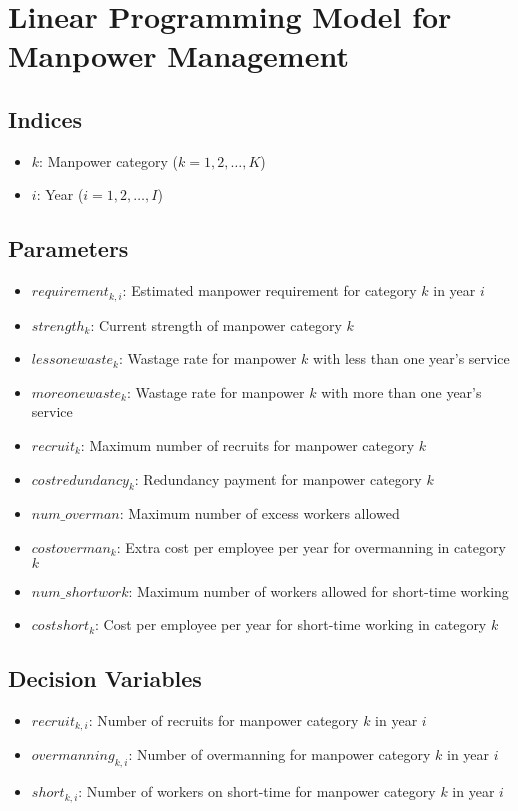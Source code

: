 \documentclass{article}
\begin{document}
\section*{Linear Programming Model for Manpower Management}

\subsection*{Indices}
\begin{itemize}
    \item $k$: Manpower category ($k = 1, 2, \ldots, K$)
    \item $i$: Year ($i = 1, 2, \ldots, I$)
\end{itemize}

\subsection*{Parameters}
\begin{itemize}
    \item $requirement_{k,i}$: Estimated manpower requirement for category $k$ in year $i$
    \item $strength_k$: Current strength of manpower category $k$
    \item $lessonewaste_k$: Wastage rate for manpower $k$ with less than one year's service
    \item $moreonewaste_k$: Wastage rate for manpower $k$ with more than one year's service
    \item $recruit_k$: Maximum number of recruits for manpower category $k$
    \item $costredundancy_k$: Redundancy payment for manpower category $k$
    \item $num\_overman$: Maximum number of excess workers allowed
    \item $costoverman_k$: Extra cost per employee per year for overmanning in category $k$
    \item $num\_shortwork$: Maximum number of workers allowed for short-time working
    \item $costshort_k$: Cost per employee per year for short-time working in category $k$
\end{itemize}

\subsection*{Decision Variables}
\begin{itemize}
    \item $recruit_{k,i}$: Number of recruits for manpower category $k$ in year $i$
    \item $overmanning_{k,i}$: Number of overmanning for manpower category $k$ in year $i$
    \item $short_{k,i}$: Number of workers on short-time for manpower category $k$ in year $i$
\end{itemize}
\end{document}
